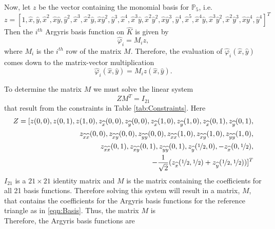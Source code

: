 

Now, let $z$ be the vector containing the monomial basis for $\mathbb{P}_5$, i.e.
\small{
\begin{equation*}
  z=\left[
    1, \hat{x}, \hat{y}, \hat{x}^2, \hat{x}\hat{y}, \hat{y}^2, \hat{x}^3, \hat{x}^2\hat{y}, \hat{x}\hat{y}^2, \hat{y}^3, \hat{x}^4, \hat{x}^3\hat{y}, 
    \hat{x}^2\hat{y}^2, \hat{x}\hat{y}^3, \hat{y}^4, \hat{x}^5, \hat{x}^4\hat{y}, \hat{x}^3\hat{y}^2, \hat{x}^2\hat{y}^3, \hat{x}\hat{y}^4, \hat{y}^4 
  \right]^{T}
\end{equation*}}
Then the $i^{th}$ Argyris basis function on $\hat{K}$ is given by
\begin{equation*}
  \hat{\varphi}_i = M_i z,
\end{equation*}
where $M_i$ is the $i^{th}$ row of the matrix $M$. Therefore, the evaluation of
$\hat{\varphi}_i(\hat{x},\hat{y})$ comes down to the matrix-vector multiplication
\begin{equation*}
  \hat{\varphi}_i(\hat{x},\hat{y}) = M_i z(\hat{x},\hat{y}).
\end{equation*}

To determine the matrix $M$ we must solve the linear system 
\begin{equation*}
  ZM^T=I_{21}
\end{equation*}
that result from the constraints in Table \ref{tab:Constraints}. Here
\begin{equation*}
  \begin{split}Z=[z(0,0), z(0,1), z(1,0), 
  z_{\hat{x}}(0,0), z_{\hat{y}}(0,0), 
  z_{\hat{x}}(1,0), z_{\hat{y}}(1,0), 
  z_{\hat{x}}(0,1), z_{\hat{y}}(0,1), \\
  z_{\hat{x}\hat{x}}(0,0), z_{\hat{x}\hat{y}}(0,0), z_{\hat{y}\hat{y}}(0,0), 
  z_{\hat{x}\hat{x}}(1,0), z_{\hat{x}\hat{y}}(1,0), z_{\hat{y}\hat{y}}(1,0), \\
  z_{\hat{x}\hat{x}}(0,1), z_{\hat{x}\hat{y}}(0,1), z_{\hat{y}\hat{y}}(0,1), 
  z_{\hat{y}}(\nicefrac{1}{2},0), -z_{\hat{x}}(0,\nicefrac{1}{2}), \\
  -\frac{1}{\sqrt{2}}(z_{\hat{x}}(\nicefrac{1}{2},\nicefrac{1}{2}) +
  z_{\hat{y}}(\nicefrac{1}{2},\nicefrac{1}{2}))]^T\end{split}
\end{equation*}
$I_{21}$ is a $21\times 21$ identity matrix and $M$ is the matrix containing the
coefficients for all 21 basis functions. Therefore solving this system will
result in a matrix, $M$, that contains the coefficients for the Argyris basis
functions for the reference triangle as in \eqref{eqn:Basis}. Thus, the matrix
$M$ is \\ 

Therefore, the Argyris basis functions are


